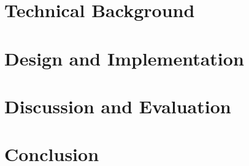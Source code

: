 \section{Technical Background}\label{section:background}

\section{Design and Implementation}\label{section:design/implementation}

\section{Discussion and Evaluation}\label{section:discussion/evaluation}

\section{Conclusion}


